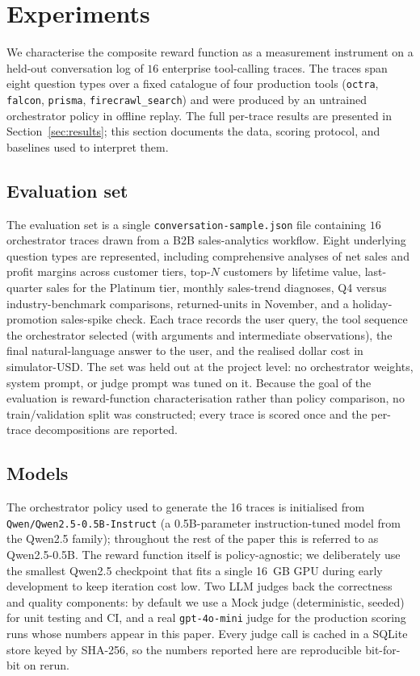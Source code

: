 \documentclass[10pt,twocolumn]{article}
\begin{document}
\section{Experiments}
\label{sec:experiments}

We characterise the composite reward function as a measurement instrument on a held-out conversation log of $16$ enterprise tool-calling traces. The traces span eight question types over a fixed catalogue of four production tools (\texttt{octra}, \texttt{falcon}, \texttt{prisma}, \texttt{firecrawl\_search}) and were produced by an untrained orchestrator policy in offline replay. The full per-trace results are presented in Section~\ref{sec:results}; this section documents the data, scoring protocol, and baselines used to interpret them.

\subsection{Evaluation set}
\label{sec:experiments:dataset}
The evaluation set is a single \texttt{conversation-sample.json} file containing $16$ orchestrator traces drawn from a B2B sales-analytics workflow. Eight underlying question types are represented, including comprehensive analyses of net sales and profit margins across customer tiers, top-$N$ customers by lifetime value, last-quarter sales for the Platinum tier, monthly sales-trend diagnoses, Q4 versus industry-benchmark comparisons, returned-units in November, and a holiday-promotion sales-spike check. Each trace records the user query, the tool sequence the orchestrator selected (with arguments and intermediate observations), the final natural-language answer to the user, and the realised dollar cost in simulator-USD. The set was held out at the project level: no orchestrator weights, system prompt, or judge prompt was tuned on it. Because the goal of the evaluation is reward-function characterisation rather than policy comparison, no train/validation split was constructed; every trace is scored once and the per-trace decompositions are reported.

\subsection{Models}
\label{sec:experiments:models}
The orchestrator policy used to generate the 16 traces is initialised from \texttt{Qwen/Qwen2.5-0.5B-Instruct} (a 0.5B-parameter instruction-tuned model from the Qwen2.5 family); throughout the rest of the paper this is referred to as Qwen2.5-0.5B. The reward function itself is policy-agnostic; we deliberately use the smallest Qwen2.5 checkpoint that fits a single 16~GB GPU during early development to keep iteration cost low. Two LLM judges back the correctness and quality components: by default we use a Mock judge (deterministic, seeded) for unit testing and CI, and a real \texttt{gpt-4o-mini} judge for the production scoring runs whose numbers appear in this paper. Every judge call is cached in a SQLite store keyed by SHA-256, so the numbers reported here are reproducible bit-for-bit on rerun.
\end{document}
